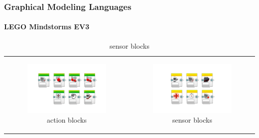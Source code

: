 \documentclass[11 pt,t]{beamer}
\begin{document}
\begin{frame}
\vspace{-1.4cm}
  \frametitle{Graphical Modeling Languages}
  \framesubtitle{LEGO Mindstorms EV3}
    \begin{table}[h!]
    \begin{center}
      \begin{tabular}{cc}
      
      \begin{subfigure}{0.5\textwidth}\centering\includegraphics[width=\textwidth]{../images/LearnToProgram_action_blocks_landscape.png}\caption{action blocks}\end{subfigure}&
      \begin{subfigure}{0.5\textwidth}\centering\includegraphics[width=\textwidth]{../images/LearnToProgram_sensor_blocks_landscape.png}\caption{sensor blocks}\end{subfigure}\\


\end{tabular}
\end{center}
\end{table}
\end{frame}
\end{document}
